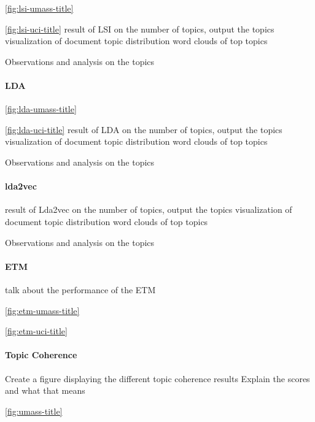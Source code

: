 \documentclass[letterpaper,12pt]{article}
\begin{document}
\ref{fig:lsi-umass-title}

\ref{fig:lsi-uci-title}
result of LSI on the number of topics, output the topics
visualization of document topic distribution
word clouds of top topics

Observations and analysis on the topics
\newpage
\paragraph{LDA}

\ref{fig:lda-umass-title}

\ref{fig:lda-uci-title}
result of LDA on the number of topics, output the topics
visualization of document topic distribution
word clouds of top topics

Observations and analysis on the topics
\newpage
\paragraph{lda2vec}
result of Lda2vec on the number of topics, output the topics
visualization of document topic distribution
word clouds of top topics

Observations and analysis on the topics

\paragraph{ETM}


talk about the performance of the ETM

\ref{fig:etm-umass-title}

\ref{fig:etm-uci-title}
\newpage
\paragraph{Topic Coherence}
Create a figure displaying the different topic coherence results
Explain the scores and what that means

\ref{fig:umass-title}
\end{document}
